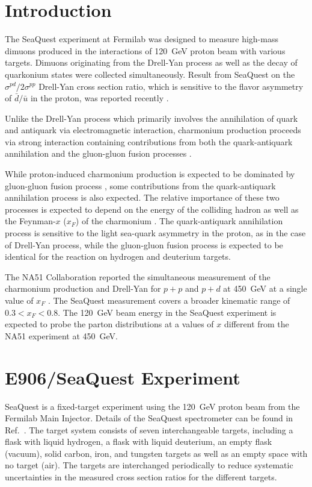 \documentclass[10pt,a4paper,final]{article}
\begin{document}
\section{Introduction}
\label{sec:intro}
The SeaQuest experiment at Fermilab was designed to measure high-mass dimuons
produced in the interactions of \SI{120}{\GeV} proton beam with various targets.
Dimuons originating from the Drell-Yan process \cite{drell1970} as well as the
decay of quarkonium states were collected simultaneously. Result from SeaQuest
on the $\sigma^{pd}/2\sigma^{pp}$ Drell-Yan cross section ratio, which is sensitive to
the flavor asymmetry of $\bar{d}/\bar{u}$ in the proton, was reported recently
\cite{dove2021}.

Unlike the Drell-Yan process which primarily involves the annihilation of quark
and antiquark via electromagnetic interaction, charmonium production proceeds
via strong interaction containing contributions from both the quark-antiquark
annihilation and the gluon-gluon fusion processes \cite{vogt1999}.

While proton-induced charmonium production is expected to be dominated by gluon-gluon
fusion process \cite{vogt1999}, some contributions from the quark-antiquark
annihilation process is also expected. The relative importance of these two
processes is expected to depend on the energy of the colliding hadron as well
as the Feynman-$x$ ($x_F$) of the charmonium \cite{peng1995}. The quark-antiquark
annihilation process is sensitive to the light sea-quark asymmetry in the proton,
as in the case of Drell-Yan process, while the gluon-gluon fusion process is expected
to be identical for the reaction on hydrogen and deuterium targets.

The NA51 Collaboration reported the simultaneous measurement of the charmonium
production and Drell-Yan for $p+p$ and $p+d$ at \SI{450}{\GeV} at a single value
of $x_F$ \cite{abreu1998}. The SeaQuest measurement covers a broader kinematic
range of $0.3<x_F<0.8$. The \SI{120}{\GeV} beam energy in the SeaQuest experiment
is expected to probe the parton distributions at a values of $x$ different from the
NA51 experiment at \SI{450}{\GeV}.


\section{E906/SeaQuest Experiment}
\label{sec:e906}
SeaQuest is a fixed-target experiment using the \SI{120}{\GeV} proton beam
from the Fermilab Main Injector. Details of the SeaQuest spectrometer can be
found in Ref.~\cite{aidala2019}. The target system consists of seven
interchangeable targets, including a flask with liquid hydrogen, a flask with
liquid deuterium, an empty flask (vacuum), solid carbon, iron, and tungsten
targets as well as an empty space with no target (air). The targets are interchanged
periodically to reduce systematic uncertainties in the measured cross section
ratios for the different targets.
\end{document}

